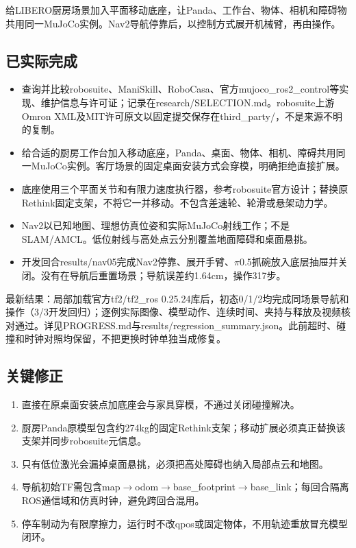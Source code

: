 \label{stage:s15}

给LIBERO厨房场景加入平面移动底座，让Panda、工作台、物体、相机和障碍物共用同一MuJoCo实例。Nav2导航停靠后，以控制方式展开机械臂，再由\pifive{}操作。

\subsection{已实际完成}\label{s15-detail-1}

\begin{itemize}
\tightlist
\item
  查询并比较robosuite、ManiSkill、RoboCasa、官方mujoco\_ros2\_control等实现、维护信息与许可证；记录在research/SELECTION.md。robosuite上游Omron XML及MIT许可原文以固定提交保存在third\_party/，不是来源不明的复制。
\item
  给合适的厨房工作台加入移动底座，Panda、桌面、物体、相机、障碍共用同一MuJoCo实例。客厅场景的固定桌面安装方式会穿模，明确拒绝直接扩展。
\item
  底座使用三个平面关节和有限力速度执行器，参考robosuite官方设计；替换原Rethink固定支架，不将它一并移动。不包含差速轮、轮滑或悬架动力学。
\item
  Nav2以已知地图、理想仿真位姿和实际MuJoCo射线工作；不是SLAM/AMCL。低位射线与高处点云分别覆盖地面障碍和桌面悬挑。
\item
  开发回合results/nav05完成Nav2停靠、展开手臂、\(\pi\)0.5抓碗放入底层抽屉并关闭。没有在导航后重置场景；导航误差约1.64cm，操作317步。
\end{itemize}

最新结果：局部加载官方tf2/tf2\_ros 0.25.24库后，初态0/1/2均完成同场景导航和操作（3/3开发回归）；逐例实际图像、模型动作、连续时间、夹持与释放及视频核对通过。详见PROGRESS.md与results/regression\_summary.json。此前超时、碰撞和时钟对照均保留，不把更换时钟单独当成修复。

\subsection{关键修正}\label{s15-detail-2}

\begin{enumerate}
\def\labelenumi{\arabic{enumi}.}
\tightlist
\item
  直接在原桌面安装点加底座会与家具穿模，不通过关闭碰撞解决。
\item
  厨房Panda原模型包含约274kg的固定Rethink支架；移动扩展必须真正替换该支架并同步robosuite元信息。
\item
  只有低位激光会漏掉桌面悬挑，必须把高处障碍也纳入局部点云和地图。
\item
  导航初始TF需包含map\(\rightarrow\)odom\(\rightarrow\)base\_footprint\(\rightarrow\)base\_link；每回合隔离ROS通信域和仿真时钟，避免跨回合混用。
\item
  停车制动为有限摩擦力，运行时不改qpos或固定物体，不用轨迹重放冒充模型闭环。
\end{enumerate}


